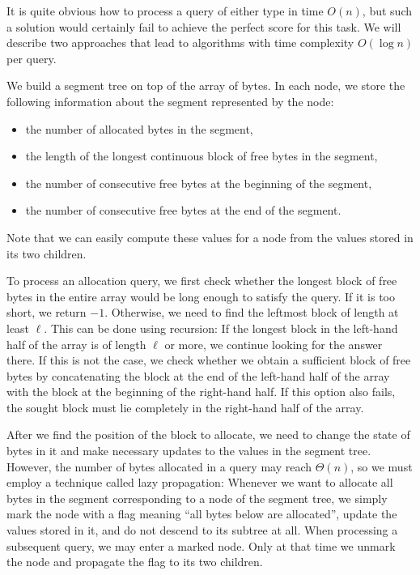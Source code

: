 

It is quite obvious how to process a query of either type in time $O(n)$, but
such a solution would certainly fail to achieve the perfect score for this task.
We will describe two approaches that lead to algorithms with time complexity
$O(\log n)$ per query.



We build a segment tree on top of the array of bytes. In each node, we store the
following information about the segment represented by the node:
\begin{itemize}
\item the number of allocated bytes in the segment,
\item the length of the longest continuous block of free bytes in the segment,
\item the number of consecutive free bytes at the beginning of the segment,
\item the number of consecutive free bytes at the end of the segment.
\end{itemize}
Note that we can easily compute these values for a node from the values stored
in its two children.

\bigskip

To process an allocation query, we first check whether the longest block of free
bytes in the entire array would be long enough to satisfy the query. If it is
too short, we return $-1$. Otherwise, we need to find the leftmost block of
length at least $\ell$. This can be done using recursion: If the longest block
in the left-hand half of the array is of length $\ell$ or more, we continue
looking for the answer there. If this is not the case, we check whether we
obtain a sufficient block of free bytes by concatenating the block at the end of
the left-hand half of the array with the block at the beginning of the right-hand
half. If this option also fails, the sought block must lie completely in the
right-hand half of the array.

After we find the position of the block to allocate, we need to change the state
of bytes in it and make necessary updates to the values in the segment tree.
However, the number of bytes allocated in a query may reach $\Theta(n)$, so we
must employ a technique called lazy propagation: Whenever we want to allocate
all bytes in the segment corresponding to a node of the segment tree, we simply
mark the node with a flag meaning ``all bytes below are allocated'', update the
values stored in it, and do not descend to its subtree at all. When processing
a subsequent query, we may enter a marked node. Only at that time we unmark the
node and propagate the flag to its two children.

